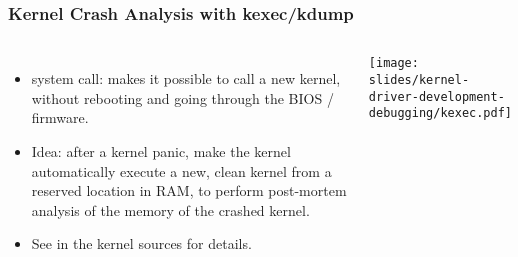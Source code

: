 \begin{frame}
  \frametitle{Kernel Crash Analysis with kexec/kdump}
  \begin{columns}
    \begin{itemize}
    \item {} system call: makes it possible to call a new
      kernel, without rebooting and going through the BIOS / firmware.
    \item Idea: after a kernel panic, make the kernel automatically
      execute a new, clean kernel from a reserved location in RAM, to
      perform post-mortem analysis of the memory of the crashed
      kernel.
    \item See  in the kernel
      sources for details.
    \end{itemize}
    \texttt{[image: slides/kernel-driver-development-debugging/kexec.pdf]}
  \end{columns}
\end{frame}
